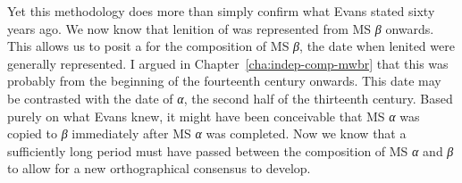 Yet this methodology does more than simply confirm what Evans stated sixty years ago. We now know  that lenition of  was represented from MS \textit{β} onwards. This allows us to posit a  for the composition of MS \textit{β}, \ie the date when lenited  were generally represented. I argued in Chapter~\ref{cha:indep-comp-mwbr} that this was probably from the beginning of the fourteenth century onwards. This date may be contrasted with the date of \textit{α}, the second half of the thirteenth century. Based purely on what Evans knew, it might have been conceivable that MS \textit{α} was copied to \textit{β} immediately after  MS \textit{α} was completed. Now we know that a sufficiently long period must have passed between the composition of MS \textit{α} and \textit{β} to allow for a new orthographical consensus to develop. 

